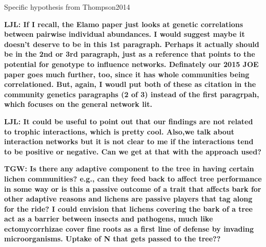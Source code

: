 \documentclass[11pt,twocolumn,twoside,lineno]{pnas-new}
\begin{document}
Specific hypothesis from Thompson2014

\textbf{LJL: If I recall, the Elamo paper just looks at genetic
  correlations between pairwise individual abundances. I would suggest
  maybe it doesn’t deserve to be in this 1st paragraph. Perhaps it
  actually should be in the 2nd or 3rd paragraph, just as a reference
  that points to the potential for genotype to influence
  networks. Definately our 2015 JOE paper goes much further, too,
  since it has whole communities being correlationed. But, again, I
  woudl put both of these as citation in the community genetics
  paragraphs (2 of 3) instead of the first paragrpah, which focuses on
  the general network lit.}


\textbf{LJL:  It could be useful to point out that our findings are
  not related to trophic interactions, which is pretty cool. Also,we
  talk about interaction networks but it is not clear to me if the
  interactions tend to be positive or negative. Can we get at that
  with the approach used?}


\textbf{TGW:  Is there any adaptive component to the tree in having
  certain lichen communities?  e.g., can they feed back to affect tree
  performance in some way or is this a passive outcome of a trait that
  affects bark for other adaptive reasons and lichens are passive
  players that tag along for the ride?  I could envision that lichens
  covering the bark of a tree act as a barrier between insects and
  pathogens, much like ectomycorrhizae cover fine roots as a first
  line of defense by invading microorganisms.  Uptake of N that gets
  passed to the tree??}
\end{document}
